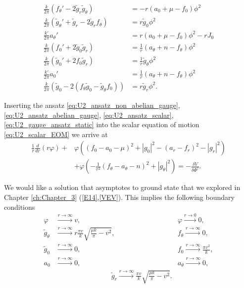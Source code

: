     \begin{align}
        \frac{k}{2 \pi } \left(f_{\theta}' - 2\tilde{g}_r \tilde{g}_{\theta}\right) &= -r \left(a_0 + \mu - f_0\right) \phi^2\\
        \frac{k}{2 \pi} \left(\tilde{g}_{\theta}' + \tilde{g}_r - 2 \tilde{g}_r f_{\theta} \right) & = r\tilde{g}_0 \phi^2 \\
        \frac{k'}{2 \pi} a_{\theta}' &= r \left(a_0 +\mu - f_0 \right)\phi^2 - rJ_0 \\
        \frac{k}{2\pi} \left(f_0'+2 \tilde{g}_0\tilde{g}_r\right) &= \frac{1}{r} \left(a_{\theta}+n - f_{\theta}\right)\phi^2 \\
        \frac{k}{2\pi}\left(\tilde{g}_0' + 2 f_0 \tilde{g}_r \right) &=\frac{1}{r} \tilde{g}_{\theta}\phi^2 \\
        \frac{k'}{2\pi} a_0'&= \frac{1}{r} \left(a_{\theta}+n - f_{\theta}\right) \phi^2 \\
        \frac{k}{2\pi} \left(\tilde{g}_0 - 2\left(f_{\theta} \tilde{g}_0 - \tilde{g}_{\theta} f_0\right)\right) &= r \tilde{g}_r \phi^2.
    \end{align}

Inserting the ansatz \ref{eq:U2_ansatz_non_abelian_gauge}, \ref{eq:U2_ansatz_abelian_gauge}, \ref{eq:U2_ansatz_scalar}, \ref{eq:U2_gauge_ansatz_static} into the scalar equation of motion \ref{eq:U2_scalar_EOM} we arrive at
\begin{align}
    \frac{1}{r} \frac{d}{dr} \left(r \varphi\right)+ &\varphi \left( \left(f_0 -a_0 -\mu\right)^2 + |g_0|^2 - \left(a_r -f_r\right)^2 - |g_r|^2 \right)\nonumber \\
    &+ \varphi \left(-\frac{1}{r^2} \left(f_{\theta} - a_{\theta} -n\right)^2 +|g_{\theta}|^2 \right) = - \frac{\delta V}{\delta \Phi^{\dag}}.
\end{align}

We would like a solution that asymptotes to ground state that we explored in Chapter \ref{ch:Chapter_3} (\eqref{E14},\eqref{VEV}). This implies the following boundary conditions
\begin{align}
    \varphi &\xrightarrow{r \rightarrow \infty} v, \qquad \qquad \qquad & \varphi \xrightarrow{r \rightarrow 0} 0,\\
    \tilde{g}_{\theta} &\xrightarrow{r \rightarrow \infty} r \frac{\pi v}{k} \sqrt{ \frac{\mu k}{\pi} -v^2}, &f_{\theta} \xrightarrow{r \rightarrow \infty}0,\\ 
    \tilde{g}_0 &\xrightarrow{r \rightarrow \infty} 0, &f_0  \xrightarrow{r \rightarrow \infty}\frac{\pi v^2}{k},\\
     a_0 &\xrightarrow{r \rightarrow \infty} 0, &a_{\theta} \xrightarrow{r \rightarrow \infty} 0,\\
    & \qquad\qquad\qquad\qquad  \tilde{g}_r \xrightarrow{r \rightarrow \infty} \frac{\pi v}{k} \sqrt{ \frac{\mu k}{\pi} -v^2}.  & 
\end{align}




